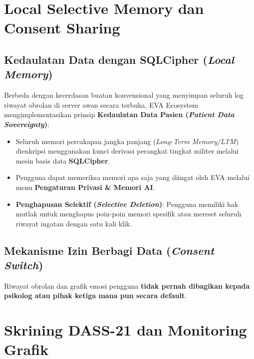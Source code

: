 \section{Local Selective Memory dan Consent Sharing}

\subsection{Kedaulatan Data dengan SQLCipher (\textit{Local Memory})}
Berbeda dengan kecerdasan buatan konvensional yang menyimpan seluruh log riwayat obrolan di server awan secara terbuka, EVA Ecosystem mengimplementasikan prinsip \textbf{Kedaulatan Data Pasien (\textit{Patient Data Sovereignty})}:
\begin{itemize}[leftmargin=1.4em]
  \item Seluruh memori percakapan jangka panjang (\textit{Long-Term Memory/LTM}) dienkripsi menggunakan kunci derivasi perangkat tingkat militer melalui mesin basis data \textbf{SQLCipher}.
  \item Pengguna dapat memeriksa memori apa saja yang diingat oleh EVA melalui menu \textbf{Pengaturan Privasi \& Memori AI}.
  \item \textbf{Penghapusan Selektif (\textit{Selective Deletion})}: Pengguna memiliki hak mutlak untuk menghapus poin-poin memori spesifik atau mereset seluruh riwayat ingatan dengan satu kali klik.
\end{itemize}

\subsection{Mekanisme Izin Berbagi Data (\textit{Consent Switch})}
Riwayat obrolan dan grafik emosi pengguna \textbf{tidak pernah dibagikan kepada psikolog atau pihak ketiga mana pun secara default}. 



\section{Skrining DASS-21 dan Monitoring Grafik}

